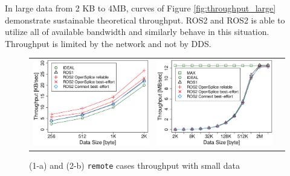 \documentclass{sig-alternate-05-2015}
\begin{document}
In large data from 2 KB to 4MB, curves of Figure \ref{fig:throughput_large} demonstrate sustainable theoretical throughput.
ROS2 and ROS2 is able to utilize all of available bandwidth and similarly behave in this situation.
Throughput is limited by the network and not by DDS.

\begin{figure}[t]
  \begin{tabular}{ccc}
    \begin{minipage}[t]{0.31\textwidth}
      \includegraphics[width=1.0\linewidth]{../figure/throughput_remote_small-data.eps}
      \caption{(1-a) and (2-b) \texttt{remote} cases throughput with small data}
      \label{fig:throughput_small}
    \end{minipage}
    &
      \begin{minipage}[t]{0.31\textwidth}
        \includegraphics[width=1.0\linewidth]{../figure/throughput_remote_large-data.eps}

\end{minipage}
\end{tabular}
\end{figure}
\end{document}
